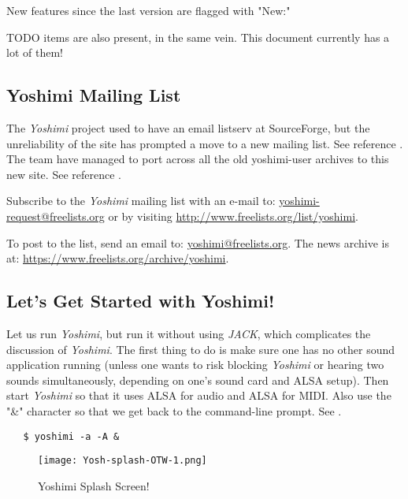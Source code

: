 \documentclass[
 11pt,
 twoside,
 a4paper,
 headinclude,
 footinclude,
 final                                 %
]{article}
\begin{document}
   New features
   since the last version are flagged with "New:"

   TODO items
   are also present, in the same vein.
   This document currently has a lot of them!

\subsection{Yoshimi Mailing List}
\label{subsec:introduction_mailing_list}

   The \textsl{Yoshimi} project used to have an email listserv at
   SourceForge, but the unreliability of the site has prompted a move to a
   new mailing list.  See reference \cite{yoshiminews}.  The team have
   managed to port across all the old yoshimi-user archives to this new
   site.  See reference \cite{yoshiminewsarchive}.

   Subscribe to the \textsl{Yoshimi} mailing list with an e-mail to:
   \url{yoshimi-request@freelists.org} or by visiting 
   \url{http://www.freelists.org/list/yoshimi}.

   To post to the list, send an email to: \url{yoshimi@freelists.org}.
   The news archive is at: \url{https://www.freelists.org/archive/yoshimi}.

\subsection{Let's Get Started with Yoshimi!}
\label{subsec:introduction_lets_get_started}

   Let us run \textsl{Yoshimi}, but run it without using \textsl{JACK}, which
   complicates the discussion of \textsl{Yoshimi}.  The first
   thing to do is make sure one has no other sound application running
   (unless one wants to risk blocking \textsl{Yoshimi} or hearing two sounds
   simultaneously, depending on one's sound card and ALSA setup).
   Then start \textsl{Yoshimi} so that it uses ALSA for audio and ALSA for
   MIDI.  Also use the "\&" character so that we get back to the
   command-line prompt.
   See .

\begin{verbatim}
   $ yoshimi -a -A &
\end{verbatim}

\begin{figure}[H]
   \centering 
   \texttt{[image: Yosh-splash-OTW-1.png]}
   \caption{Yoshimi Splash Screen!}
   \label{fig:yoshimi_splash_screen}
\end{figure}
\end{document}
